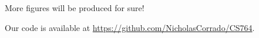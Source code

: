 \documentclass[10pt]{article}
\begin{document}
More figures will be produced for sure!

Our code is available at \url{https://github.com/NicholasCorrado/CS764}. 










\begin{comment}
\section{Deploying lookahead filters in distributed systems}

In this section we discuss a method to deploy the LIP filters in distributed systems. This method incorporates LIP and the \textsc{hypercube} algorithm \cite{zhu2017looking,}.


Let $p$ be the number of machines available. Let $k_i$ be the primary key of $D_i$, and each tuple in the fact table $F$ possesses a foreign key to each $D_i$. Suppose $p = \prod_{1 \leq i \leq n} p_i$,  and then we label each of the $p$ machines with a coordinate $(x_1, x_2, \dots, x_n)$ where each $1 \leq x_i \leq p_i$.

We first pick $n$ hash functions $h_i$ such that the range of each $h_i$ is $\{1, 2, \dots, p_i\}$. Then for each dimension table $D_i$ and for each primary key $k_i$ in $D_i$, we send $k_i$ to all machines with $i$-th component being $h_i(k_i)$. 

\end{comment}
\end{document}
